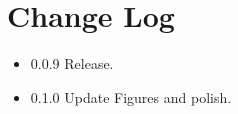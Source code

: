 \section{Change Log}
\begin{itemize}
\item{0.0.9} Release.
\item{0.1.0} Update Figures and polish.
\end{itemize}
